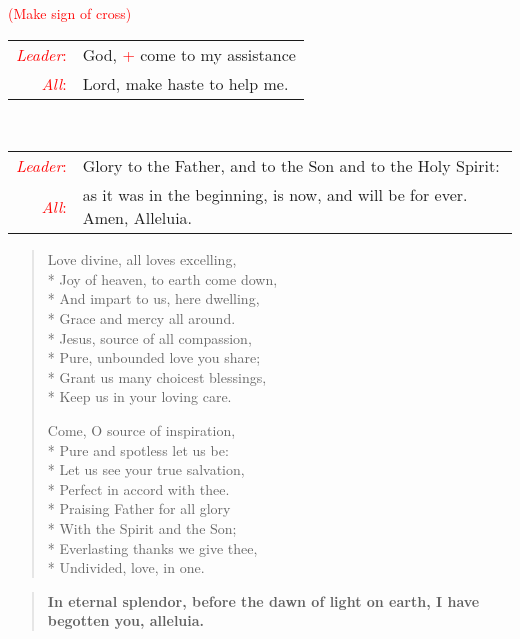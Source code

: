 \documentclass[letterpaper,14pt]{extarticle}
\newcommand{\side}[1]{\flagverse{\textcolor{red}{\textit{#1}}:}}
\newcommand{\sidestar}[1]{\textcolor{red}{\textit{#1}:}}
\newcommand{\rednote}[1]{\textcolor{red}{#1}}
\newlength{\oldindent}
\newcommand{\antiphon}[2]{
	\setlength{\oldindent}{\vindent}
	\setlength{\vindent}{0em}
	\begin{verse}
	\side{#1} \textbf{#2}
	\end{verse}
	\setlength{\vindent}{\oldindent}
}
\newcommand{\intercession}[2]{
	\begin{tabular}[h]{r p{4.25in}}
		\sidestar{Leader} & #1 \\
		\sidestar{All} & #2
	\end{tabular}}
\begin{document}
\hspace{\leftmargini}\rednote{(Make sign of cross)}\\
\intercession{God, \rednote{+} come to my assistance}
{Lord, make haste to help me.}\\
\intercession{Glory to the Father, and to the Son and to the Holy Spirit:}
{as it was in the beginning, is now, and will be for ever. Amen, Alleluia.}

\begin{verse}
	Love divine, all loves excelling, \\*
	Joy of heaven, to earth come down, \\*
And impart to us, here dwelling, \\*
Grace and mercy all around. \\*
Jesus, source of all compassion, \\*
Pure, unbounded love you share; \\*
Grant us many choicest blessings, \\*
Keep us in your loving care.

Come, O source of inspiration, \\*
Pure and spotless let us be: \\*
Let us see your true salvation, \\*
Perfect in accord with thee. \\*
Praising Father for all glory \\*
With the Spirit and the Son; \\*
Everlasting thanks we give thee, \\*
Undivided, love, in one.

\end{verse}
{}
\antiphon{Leader 1}{In eternal splendor, before the dawn of light on earth,
I have begotten you, alleluia.}  
\end{document}
